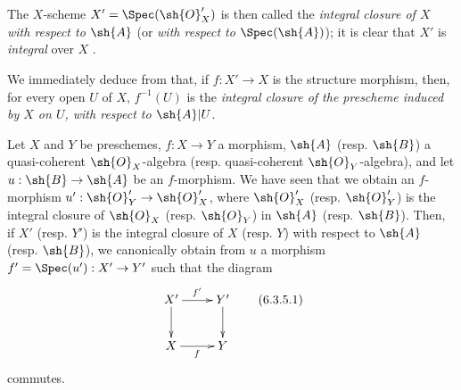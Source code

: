 The $X$-scheme $X'=\Spec(\sh{O}'_X)$ is then called the \emph{integral closure of $X$ with respect to $\sh{A}$} (or \emph{with respect to $\Spec(\sh{A})$});
it is clear that $X'$ is \emph{integral} over $X$ .

We immediately deduce from  that, if $f:X'\to X$ is the structure morphism, then, for every open $U$ of $X$, $f^{-1}(U)$ is the \emph{integral closure of the prescheme induced by $X$ on $U$, with respect to $\sh{A}|U$}.

\begin{env}[6.3.5]
\label{II.6.3.5}
Let $X$ and $Y$ be preschemes, $f:X\to Y$ a morphism, $\sh{A}$ (resp. $\sh{B}$) a quasi-coherent $\sh{O}_X$-algebra (resp. quasi-coherent $\sh{O}_Y$-algebra), and let $u:\sh{B}\to\sh{A}$ be an $f$-morphism.
We have seen  that we obtain an $f$-morphism $u':\sh{O}'_Y\to\sh{O}'_X$, where $\sh{O}'_X$ (resp. $\sh{O}'_Y$) is the integral closure of $\sh{O}_X$ (resp. $\sh{O}_Y$) in $\sh{A}$ (resp. $\sh{B}$).
Then, if $X'$ (resp. $Y'$) is the integral closure of $X$ (resp. $Y$) with respect to $\sh{A}$ (resp. $\sh{B}$), we canonically obtain from $u$ a morphism $f'=\Spec(u'):X'\to Y'$  such that the diagram
\[
\label{II.6.3.5.1}
  \xymatrix{
    X' \ar[r]^{f'} \ar[d]
    & Y' \ar[d]
  \\X \ar[r]_{f}
    & Y
  }
\tag{6.3.5.1}
\]
commutes.
\end{env}

